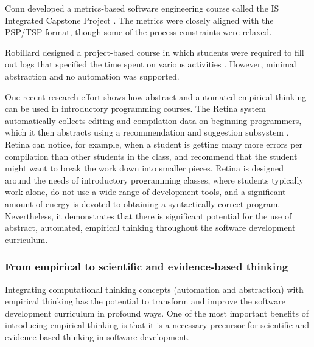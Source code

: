 Conn developed a metrics-based software engineering course called the 
IS Integrated Capstone Project \cite{Conn04}.  The metrics were closely aligned
with the PSP/TSP format, though some of the process constraints were relaxed. 

Robillard designed a project-based course in which students were required
to fill out logs that specified the time spent on various activities
\cite{Robillard98}.  However, minimal abstraction and no automation was supported.

One recent research effort shows how abstract and automated empirical thinking
can be used in introductory programming courses. The Retina system automatically collects editing and compilation data on beginning
programmers,  which it then abstracts using a recommendation and suggestion
subsystem \cite{Murphy09}.  Retina can notice, for example, when a student
is getting many more errors per compilation than other students in the
class, and recommend that the student might want to break the work down
into smaller pieces.  Retina is designed around the needs of introductory
programming classes, where students typically work alone, do not use a wide
range of development tools, and a significant amount of energy is devoted
to obtaining a syntactically correct program.  Nevertheless, it demonstrates that there is significant potential for the use of abstract, automated, empirical thinking throughout the software development curriculum.

\subsubsection{From empirical to scientific and evidence-based thinking}

Integrating computational thinking concepts (automation and abstraction) with empirical thinking has the potential to transform and improve the software 
development curriculum in profound ways. One of the most important benefits of introducing empirical thinking is that it is a necessary precursor for scientific and evidence-based thinking in software development. 

